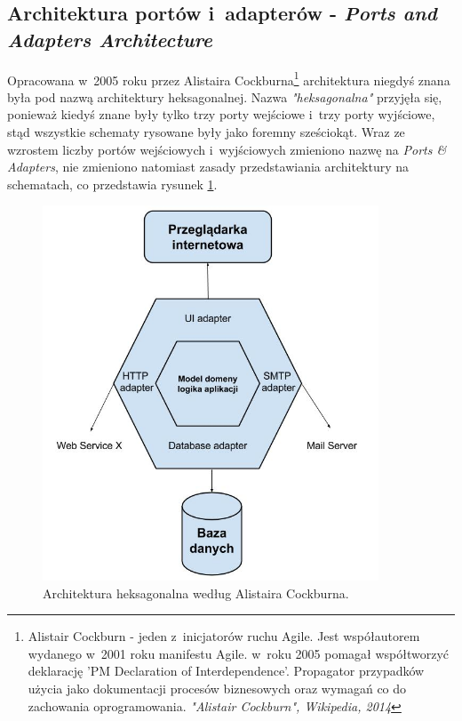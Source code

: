 \subsection{Architektura portów i~adapterów - \textit{Ports and Adapters \newline Architecture}}
Opracowana w~2005 roku przez Alistaira Cockburna\footnote{Alistair Cockburn - jeden z~inicjatorów ruchu Agile. Jest współautorem wydanego w~2001 roku manifestu Agile. w~roku 2005 pomagał współtworzyć deklarację 'PM Declaration of Interdependence'. Propagator przypadków użycia jako dokumentacji procesów biznesowych oraz wymagań co do zachowania oprogramowania. \textit{"Alistair Cockburn", Wikipedia, 2014}} architektura niegdyś znana była pod nazwą architektury heksagonalnej\cite{website:architect:hexagonal}. Nazwa \textit{"heksagonalna"} przyjęła się, ponieważ kiedyś znane były tylko trzy porty wejściowe i~trzy porty wyjściowe, stąd wszystkie schematy rysowane były jako foremny sześciokąt. Wraz ze wzrostem liczby portów wejściowych i~wyjściowych zmieniono nazwę na \textit{Ports \& Adapters}, nie zmieniono natomiast zasady przedstawiania architektury na schematach, co przedstawia rysunek \ref{fig:hexagonal_architecture}.

\begin{figure}[!htb]
    \centering
    \includegraphics[width=10cm]{imgs/ch4_hexagonal_architecture_3.jpg}
    \caption
{Architektura heksagonalna według Alistaira Cockburna.}
    \label{fig:hexagonal_architecture}
\end{figure} 

